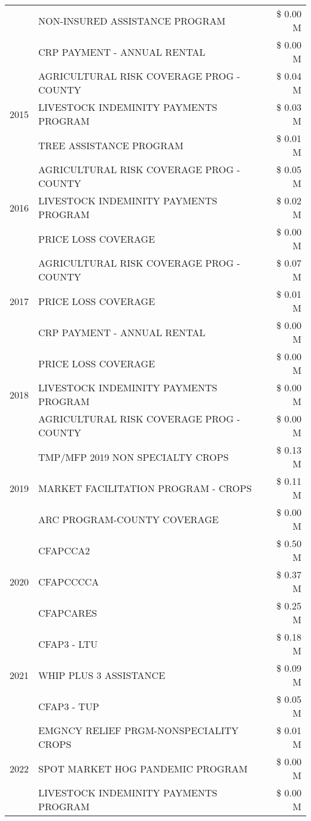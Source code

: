 \begin{tabular}{llr}
 & NON-INSURED ASSISTANCE PROGRAM & \$ 0.00 M \\
 & CRP PAYMENT - ANNUAL RENTAL & \$ 0.00 M \\
\cline{1-3}
\multirow[t]{3}{*}{2015} & AGRICULTURAL RISK COVERAGE PROG - COUNTY & \$ 0.04 M \\
 & LIVESTOCK INDEMINITY PAYMENTS PROGRAM & \$ 0.03 M \\
 & TREE ASSISTANCE PROGRAM & \$ 0.01 M \\
\cline{1-3}
\multirow[t]{3}{*}{2016} & AGRICULTURAL RISK COVERAGE PROG - COUNTY & \$ 0.05 M \\
 & LIVESTOCK INDEMINITY PAYMENTS PROGRAM & \$ 0.02 M \\
 & PRICE LOSS COVERAGE & \$ 0.00 M \\
\cline{1-3}
\multirow[t]{3}{*}{2017} & AGRICULTURAL RISK COVERAGE PROG - COUNTY & \$ 0.07 M \\
 & PRICE LOSS COVERAGE & \$ 0.01 M \\
 & CRP PAYMENT - ANNUAL RENTAL & \$ 0.00 M \\
\cline{1-3}
\multirow[t]{3}{*}{2018} & PRICE LOSS COVERAGE & \$ 0.00 M \\
 & LIVESTOCK INDEMINITY PAYMENTS PROGRAM & \$ 0.00 M \\
 & AGRICULTURAL RISK COVERAGE PROG - COUNTY & \$ 0.00 M \\
\cline{1-3}
\multirow[t]{3}{*}{2019} & TMP/MFP 2019 NON SPECIALTY CROPS & \$ 0.13 M \\
 & MARKET FACILITATION PROGRAM - CROPS & \$ 0.11 M \\
 & ARC PROGRAM-COUNTY COVERAGE & \$ 0.00 M \\
\cline{1-3}
\multirow[t]{3}{*}{2020} & CFAPCCA2 & \$ 0.50 M \\
 & CFAPCCCCA & \$ 0.37 M \\
 & CFAPCARES & \$ 0.25 M \\
\cline{1-3}
\multirow[t]{3}{*}{2021} & CFAP3 - LTU & \$ 0.18 M \\
 & WHIP PLUS 3 ASSISTANCE & \$ 0.09 M \\
 & CFAP3 - TUP & \$ 0.05 M \\
\cline{1-3}
\multirow[t]{3}{*}{2022} & EMGNCY RELIEF PRGM-NONSPECIALITY CROPS & \$ 0.01 M \\
 & SPOT MARKET HOG PANDEMIC PROGRAM & \$ 0.00 M \\
 & LIVESTOCK INDEMINITY PAYMENTS PROGRAM & \$ 0.00 M \\
\cline{1-3}
\bottomrule
\end{tabular}
